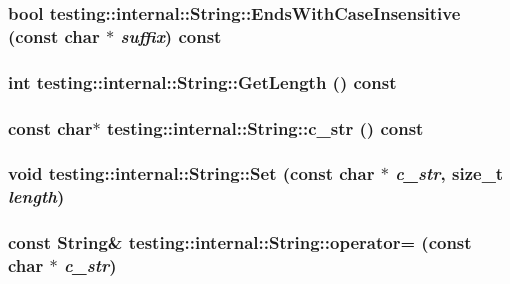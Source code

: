\subsubsection{\setlength{\rightskip}{0pt plus 5cm}bool testing::internal::String::EndsWithCaseInsensitive (const char $\ast$ {\em suffix}) const}\label{classtesting_1_1internal_1_1String_b07c8e43269d6082c3e31c3a16780ac7}


\subsubsection{\setlength{\rightskip}{0pt plus 5cm}int testing::internal::String::GetLength () const\hspace{0.3cm}{\tt  [inline]}}\label{classtesting_1_1internal_1_1String_044d3337dc1568ab3d7aa04194331cd5}


\subsubsection{\setlength{\rightskip}{0pt plus 5cm}const char$\ast$ testing::internal::String::c\_\-str () const\hspace{0.3cm}{\tt  [inline]}}\label{classtesting_1_1internal_1_1String_88be98337a01ae18eb6c3f084288e0a5}


\subsubsection{\setlength{\rightskip}{0pt plus 5cm}void testing::internal::String::Set (const char $\ast$ {\em c\_\-str}, size\_\-t {\em length})}\label{classtesting_1_1internal_1_1String_1aafeaa97ca054ab51b1a3dd077d46b6}


\subsubsection{\setlength{\rightskip}{0pt plus 5cm}const {\bf String}\& testing::internal::String::operator= (const char $\ast$ {\em c\_\-str})}\label{classtesting_1_1internal_1_1String_3e000bfea5d49f8997f31e46e484e991}


